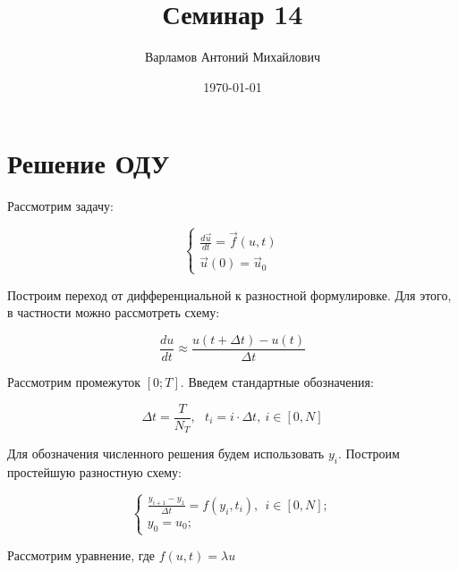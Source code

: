 \documentclass[10pt,a4paper]{article}
\title{Семинар 14}
\date{\today}
\author{Варламов Антоний Михайлович}
\begin{document}
	\maketitle


	
	\section{Решение ОДУ}
	
	Рассмотрим задачу:
	
	\begin{equation}
		\begin{cases}
			\frac{d\vec{u}}{dt} = \vec{f}\left(u, t\right)
			\\
			\vec{u}\left(0\right) = \vec{u}_{0}
		\end{cases}
	\end{equation}
	
	Построим переход от дифференциальной к разностной формулировке. Для этого, 
	в частности можно рассмотреть схему:
	
	\begin{equation}
		\frac{du}{dt} \approx \frac{u\left(t + \Delta t\right) - u\left(t
		\right)}{\Delta t}
	\end{equation}
	
	Рассмотрим промежуток $\left[0; T\right]$. Введем стандартные обозначения:
	
	\begin{equation}
 		\Delta t = \frac{T}{N_{T}},  \ \ \ t_{i} = i\cdot\Delta t, \ i \in 
 		\left[0, N\right]
	\end{equation}
	
	Для обозначения численного решения будем использовать $y_{i}$. Построим 
	простейшую разностную схему:
	
	\begin{equation}
		\begin{cases}
			\frac{y_{i + 1} - y_{1}}{\Delta t} = f\left(y_{i}, t_{i}\right), \ \ 
			i \in \left[0, N\right];
			\\
			y_{0} = u_{0};
		\end{cases}
	\end{equation}
	
	Рассмотрим уравнение, где $f\left(u, t\right) = \lambda u$
	
\end{document}
